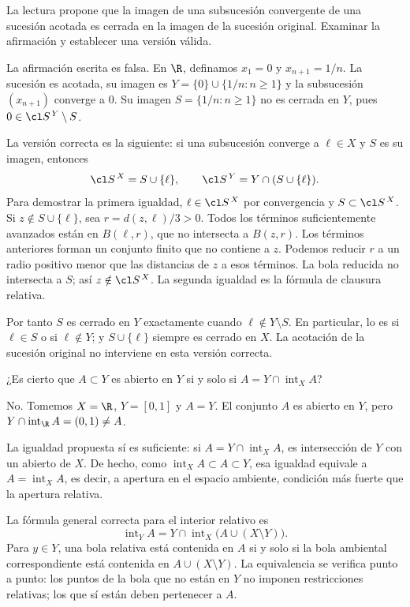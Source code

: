 \begin{ejercicio}
La lectura propone que la imagen de una subsucesión convergente de una sucesión acotada es cerrada en la imagen de la sucesión original. Examinar la afirmación y establecer una versión válida.
\end{ejercicio}
\begin{solucion}
La afirmación escrita es falsa. En $\R$, definamos $x_1=0$ y $x_{n+1}=1/n$. La sucesión es acotada, su imagen es $Y=\{0\}\cup\{1/n:n\ge1\}$ y la subsucesión $(x_{n+1})$ converge a $0$. Su imagen $S=\{1/n:n\ge1\}$ no es cerrada en $Y$, pues $0\in\cl S^{\,Y}\setminus S$.

La versión correcta es la siguiente: si una subsucesión converge a $\ell\in X$ y $S$ es su imagen, entonces
\[
\cl S^{\,X}=S\cup\{\ell\},\qquad
\cl S^{\,Y}=Y\cap(S\cup\{\ell\}).
\]
Para demostrar la primera igualdad, $\ell\in\cl S^{\,X}$ por convergencia y $S\subset\cl S^{\,X}$. Si $z\notin S\cup\{\ell\}$, sea $r=d(z,\ell)/3>0$. Todos los términos suficientemente avanzados están en $B(\ell,r)$, que no intersecta a $B(z,r)$. Los términos anteriores forman un conjunto finito que no contiene a $z$. Podemos reducir $r$ a un radio positivo menor que las distancias de $z$ a esos términos. La bola reducida no intersecta a $S$; así $z\notin\cl S^{\,X}$. La segunda igualdad es la fórmula de clausura relativa.

Por tanto $S$ es cerrado en $Y$ exactamente cuando $\ell\notin Y\setminus S$. En particular, lo es si $\ell\in S$ o si $\ell\notin Y$; y $S\cup\{\ell\}$ siempre es cerrado en $X$. La acotación de la sucesión original no interviene en esta versión correcta.
\end{solucion}

\begin{ejercicio}
¿Es cierto que $A\subset Y$ es abierto en $Y$ si y solo si $A=Y\cap\operatorname{int}_X A$?
\end{ejercicio}
\begin{solucion}
No. Tomemos $X=\R$, $Y=[0,1]$ y $A=Y$. El conjunto $A$ es abierto en $Y$, pero $Y\cap\operatorname{int}_{\R}A=(0,1)\ne A$.

La igualdad propuesta sí es suficiente: si $A=Y\cap\operatorname{int}_X A$, es intersección de $Y$ con un abierto de $X$. De hecho, como $\operatorname{int}_X A\subset A\subset Y$, esa igualdad equivale a $A=\operatorname{int}_X A$, es decir, a apertura en el espacio ambiente, condición más fuerte que la apertura relativa.

La fórmula general correcta para el interior relativo es
\[
\operatorname{int}_Y A
=Y\cap\operatorname{int}_X\bigl(A\cup(X\setminus Y)\bigr).
\]
Para $y\in Y$, una bola relativa está contenida en $A$ si y solo si la bola ambiental correspondiente está contenida en $A\cup(X\setminus Y)$. La equivalencia se verifica punto a punto: los puntos de la bola que no están en $Y$ no imponen restricciones relativas; los que sí están deben pertenecer a $A$.
\end{solucion}

